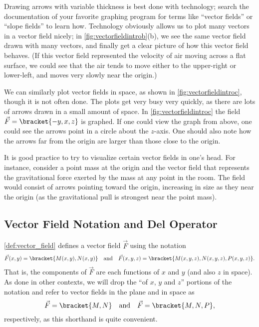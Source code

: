 Drawing arrows with variable thickness is best done with technology; search the documentation of your favorite graphing program for terms like ``vector fields'' or ``slope fields'' to learn how. Technology obviously allows us to plot many vectors in a vector field nicely; in \autoref{fig:vectorfieldintrob}(b), we see the same vector field drawn with many vectors, and finally get a clear picture of how this vector field behaves. (If this vector field represented the velocity of air moving across a flat surface, we could see that the air tends to move either to the upper-right or lower-left, and moves very slowly near the origin.)


We can similarly plot vector fields in space, as shown in \autoref{fig:vectorfieldintroc}, though it is not often done. The plots get very busy very quickly, as there are lots of arrows drawn in a small amount of space. In \autoref{fig:vectorfieldintroc} the field $\vec F =\bracket{-y,x,z}$ is graphed. If one could view the graph from above, one could see the arrows point in a circle about the $z$-axis. One should also note how the arrows far from the origin are larger than those close to the origin. 

It is good practice to try to visualize certain vector fields in one's head. For instance, consider a point mass at the origin and the vector field that represents the gravitational force exerted by the mass at any point in the room. The field would consist of arrows pointing toward the origin, increasing in size as they near the origin (as the gravitational pull is strongest near the point mass).


\subsection{Vector Field Notation and Del Operator}

\autoref{def:vector_field} defines a vector field $\vec F$ using the notation
\[
\vec F(x,y) =\bracket{M(x,y), N(x,y)}
\quad \text{and}\quad
\vec F(x,y,z) =\bracket{M(x,y,z), N(x,y,z),P(x,y,z)}.
\]
That is, the components of $\vec F$ are each functions of $x$ and $y$ (and also $z$ in space). As done in other contexts, we will drop the ``of $x$, $y$ and $z$'' portions of the notation and refer to vector fields in the plane and in space as 
\[\vec F =\bracket{M, N}\quad \text{and} \quad \vec F  =\bracket{M,N,P},\]
respectively, as this shorthand is quite convenient.

